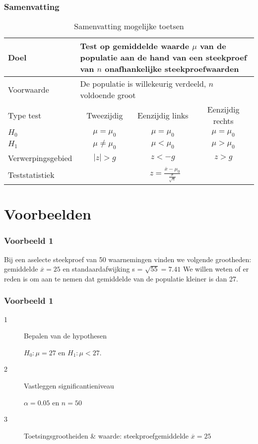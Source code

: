 \documentclass[aspectratio=169]{beamer}
\begin{document}
\begin{frame}[plain]
  \frametitle{Samenvatting}
  
  \begin{table}
    \centering
    \begin{tabular}{l|ccc}
      \toprule
      Doel              & \multicolumn{3}{l}{\parbox{.7\textwidth}{Test op gemiddelde waarde $\mu$ van de populatie aan de hand van een steekproef van $n$ onafhankelijke steekproefwaarden}} \\
      \midrule
      Voorwaarde        & \multicolumn{3}{l}{\parbox{.7\textwidth}{De populatie is willekeurig verdeeld, $n$ voldoende groot}} \\
      \midrule
      Type test         & Tweezijdig           & Eenzijdig links & Eenzijdig rechts \\
      \midrule
      $H_{0}$           & $\mu = \mu_{0}$      & $\mu = \mu_{0}$ & $\mu = \mu_{0}$  \\
      $H_{1}$           & $\mu \neq \mu_{0}$   & $\mu < \mu_{0}$ & $\mu > \mu_{0}$  \\
      Verwerpingsgebied & $\left|z\right| > g$ & $z< -g $        & $z>g$            \\
      Teststatistiek    & \multicolumn{3}{c}{$z = \frac{\overline{x} - \mu_{0}}{\frac{\sigma}{\sqrt{n}}}$} \\
      \bottomrule
    \end{tabular}
    \caption{Samenvatting mogelijke toetsen}
    \label{tab:toetsingsprocedures}
  \end{table}
\end{frame}

\section{Voorbeelden}

\begin{frame}
  \frametitle{Voorbeeld 1}
  Bij een aselecte steekproef van 50 waarnemingen vinden we volgende grootheden: gemiddelde $\overline{x} = 25$ en standaardafwijking s = $\sqrt{55} = 7.41$
  We willen weten of er reden is om aan te nemen dat gemiddelde van de populatie kleiner is dan 27.
  
\end{frame}

\begin{frame}
  \frametitle{Voorbeeld 1}
  
  \begin{description}
    \item[1] Bepalen van de hypothesen
    
    $H_{0} : \mu = 27$ en $H_{1}: \mu < 27$.
    
    \item[2] Vastleggen significantieniveau
    
    $\alpha = 0.05$ en $n=50$
    
    \item[3] Toetsingsgrootheiden \& waarde: steekproefgemiddelde $\overline{x} = 25$
    
    
  \end{description}
\end{frame}
\end{document}
